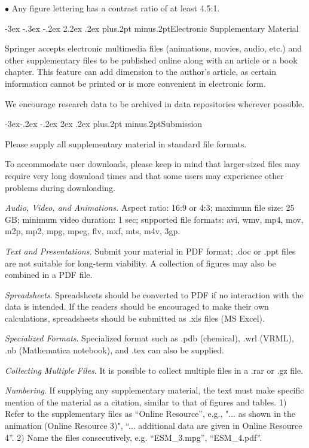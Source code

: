 \documentclass[twoside]{article}
\makeatletter
\def\section{\@startsection{section}{1}{\z@}%
 {-3ex \@plus -.3ex \@minus -.2ex}%
 {2.2ex \@plus.2ex}%
{\normalfont\normalsize\protect\baselineskip=14.5pt plus.2pt minus.2pt\bfseries}}
\def\subsection{\@startsection{subsection}{2}{\z@}%
 {-3ex\@plus -.2ex \@minus -.2ex}%
 {2ex \@plus.2ex}%
{\normalfont\normalsize\protect\baselineskip=12.5pt plus.2pt minus.2pt\bfseries}}
\makeatother
\begin{document}
\begin{multicols}{2}
$\bullet$ Any figure lettering has a contrast ratio of at least 4.5:1.

\section{Electronic Supplementary Material}

Springer accepts electronic multimedia files (animations, movies, audio, etc.) and other supplementary files to be published online along with an article or a book chapter. This feature can add dimension to the author's article, as certain information cannot be printed or is more convenient in electronic form.

We encourage research data to be archived in data repositories wherever
possible.

\subsection{Submission}

Please supply all supplementary material in standard file formats.

To accommodate user downloads, please keep in mind that larger-sized files may require very long download times and that some users may experience other problems during downloading.

{\it Audio, Video, and Animations.} Aspect ratio: 16:9 or 4:3; maximum file size: 25 GB; minimum video duration: 1 sec; supported file formats: avi, wmv, mp4, mov, m2p, mp2, mpg, mpeg, flv, mxf, mts, m4v, 3gp.

{\it Text and Presentations.} Submit your material in PDF format; .doc or .ppt files are not suitable for long-term viability. A collection of figures may also be combined in a PDF file.

{\it Spreadsheets}. Spreadsheets should be converted to PDF if no interaction with the data is intended. If the readers should be encouraged to make their own calculations, spreadsheets should be submitted as .xls files (MS Excel).

{\it Specialized Formats}. Specialized format such as .pdb (chemical), .wrl (VRML), .nb (Mathematica notebook), and .tex can also be supplied.

{\it Collecting Multiple Files}. It is possible to collect multiple files in a .rar or .gz file.

{\it Numbering}. If supplying any supplementary material, the text must make specific mention of the material as a citation, similar to that of figures and tables. 1) Refer to the supplementary files as ``Online Resource'', e.g., "... as shown in the animation (Online Resource 3)", ``... additional data are given in Online Resource 4''. 2) Name the files consecutively, e.g. ``ESM{\_}3.mpg'', ``ESM{\_}4.pdf''.


\end{multicols}
\end{document}
